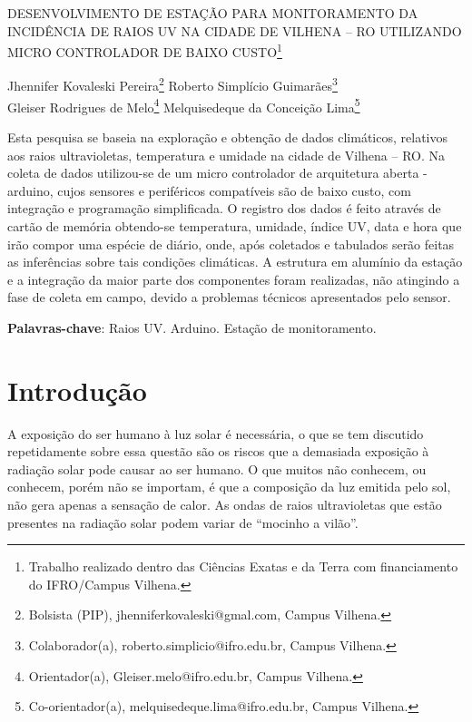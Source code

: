 \documentclass[article,12pt,onesidea,4paper,english,brazil]{abntex2}
\begin{document}
	
	
	\frenchspacing 
	
	\begin{center}
		\LARGE DESENVOLVIMENTO DE ESTAÇÃO PARA MONITORAMENTO DA INCIDÊNCIA DE RAIOS UV NA CIDADE DE VILHENA – RO UTILIZANDO MICRO CONTROLADOR DE BAIXO CUSTO\footnote{Trabalho realizado dentro das Ciências Exatas e da Terra com financiamento do IFRO/Campus Vilhena.}
		
		\normalsize
		Jhennifer Kovaleski Pereira\footnote{Bolsista (PIP), jhenniferkovaleski@gmal.com, Campus Vilhena.} 
		Roberto Simplício Guimarães\footnote{ Colaborador(a), roberto.simplicio@ifro.edu.br, Campus Vilhena.} \\
	Gleiser Rodrigues de Melo\footnote{ Orientador(a), Gleiser.melo@ifro.edu.br, Campus Vilhena.} 
		Melquisedeque da Conceição Lima\footnote{Co-orientador(a), melquisedeque.lima@ifro.edu.br, Campus Vilhena.} 
	\end{center}
	
	\begin{resumoumacoluna}
	Esta pesquisa se baseia na exploração e obtenção de dados climáticos, relativos aos raios ultravioletas, temperatura e umidade na cidade de Vilhena – RO. Na coleta de dados utilizou-se de um micro controlador de arquitetura aberta - arduino, cujos sensores e periféricos compatíveis são de baixo custo, com integração e programação simplificada. O registro dos dados é feito através de cartão de memória obtendo-se temperatura, umidade, índice UV, data e hora que irão compor uma espécie de diário, onde, após coletados e tabulados serão feitas as inferências sobre tais condições climáticas. A estrutura em alumínio da estação e a integração da maior parte dos componentes foram realizadas, não atingindo a fase de coleta em campo, devido a problemas técnicos apresentados pelo sensor.	
		
		\vspace{\onelineskip}
		
		\noindent
		\textbf{Palavras-chave}: Raios UV. Arduino. Estação de monitoramento.
	\end{resumoumacoluna}
	
	\section*{Introdução}
	
	A exposição do ser humano à luz solar é necessária, o que se tem discutido repetidamente sobre essa questão são os riscos que a demasiada exposição à radiação solar pode causar ao ser humano. O que muitos não conhecem, ou conhecem, porém não se importam, é que a composição da luz emitida pelo sol, não gera apenas a sensação de calor. As ondas de raios ultravioletas que estão presentes na radiação solar podem variar de “mocinho a vilão”.
	
\end{document}
